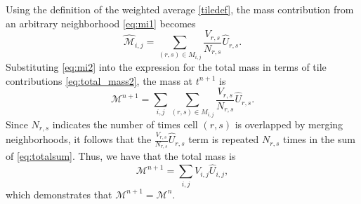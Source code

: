 Using the definition of the weighted average \eqref{tiledef}, the mass contribution from an arbitrary neighborhood \eqref{eq:mi1} becomes
\begin{equation}\label{eq:mi2}
\widehat{\mathcal{M}}_{i,j} = \sum_{(r,s) \in M_{i,j} }\frac{V_{r,s}}{N_{r,s}} \widehat U_{r,s}.
\end{equation}
Substituting \eqref{eq:mi2} into the expression for the total mass in terms of tile contributions \eqref{eq:total_mass2}, the mass at $t^{n+1}$ is
\begin{equation}\label{eq:totalsum}
\mathcal{M}^{n+1} = \sum_{i,j} \sum_{(r,s) \in M_{i,j} }\frac{V_{r,s}}{N_{r,s}} \widehat U_{r,s}.
\end{equation}
Since $N_{r,s}$ indicates the number of times cell $(r,s)$ is overlapped by merging neighborhoods, it follows that the $\frac{V_{r,s}}{N_{r,s}} \widehat U_{r,s}$ term is repeated $N_{r,s}$ times in the sum of \eqref{eq:totalsum}.  Thus, we have that the total mass is
\begin{equation} \label{eq:final}
\mathcal{M}^{n+1} = \sum_{i,j} V_{i,j} \widehat U_{i,j},
\end{equation}
which demonstrates that $\mathcal{M}^{n+1}  = \mathcal{M}^{n}$.


